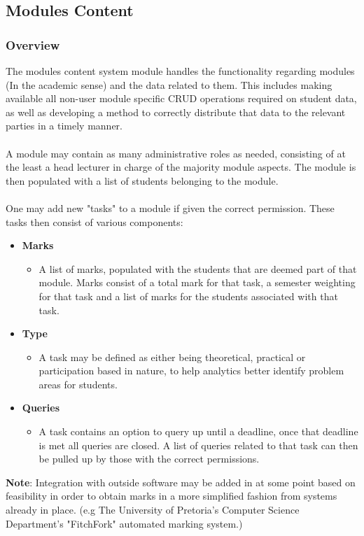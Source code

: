 \documentclass[12pt]{article}
\begin{document}
		\pagebreak
	
	\subsection{Modules Content}
	
		\subsubsection{Overview}
		
		The modules content system module handles the functionality regarding modules (In the academic sense) and the data related to them. This includes making available all non-user module specific CRUD operations required on student data, as well as developing a method to correctly distribute that data to the relevant parties in a timely manner.\\\\
		A module may contain as many administrative roles as needed, consisting of at the least a head lecturer in charge of the majority module aspects. The module is then populated with a list of students belonging to the module.\\\\
		One may add new "tasks" to a module if given the correct permission. These tasks then consist of various components:
		\begin{itemize}
			\item \textbf{Marks}
			\begin{itemize}
				\item A list of marks, populated with the students that are deemed part of that module. Marks consist of a total mark for that task, a semester weighting for that task and a list of marks for the students associated with that task.
			\end{itemize}
			\item \textbf{Type}
			\begin{itemize}
				\item A task may be defined as either being theoretical, practical or participation based in nature, to help analytics better identify problem areas for students.
			\end{itemize}
			\item \textbf{Queries}
			\begin{itemize}
				\item A task contains an option to query up until a deadline, once that deadline is met all queries are closed. A list of queries related to that task can then be pulled up by those with the correct permissions.
			\end{itemize}
		\end{itemize}
		\textbf{Note}: Integration with outside software may be added in at some point based on feasibility in order to obtain marks in a more simplified fashion from systems already in place. (e.g The University of Pretoria's Computer Science Department's "FitchFork" automated marking system.)
		
\end{document}
